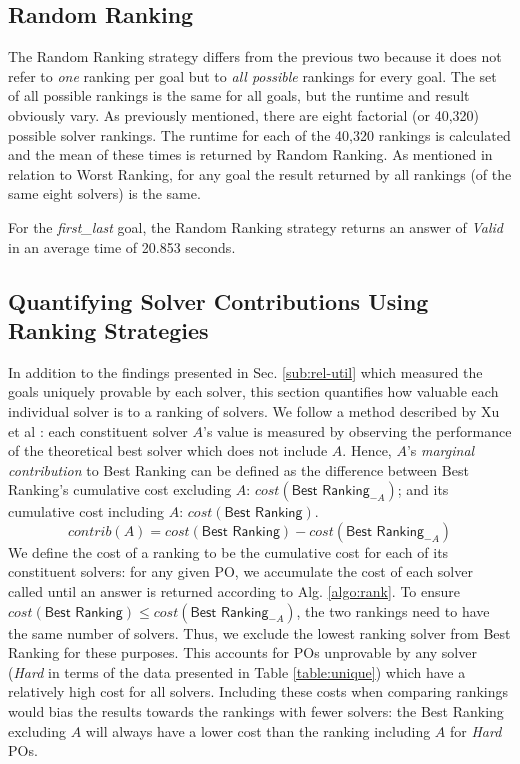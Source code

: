 \subsection{\textsf{Random Ranking}}

The \textsf{Random Ranking} strategy differs from the previous two because it does not refer to \textit{one} ranking per goal but to \textit{all possible} rankings for every goal.
The set of all possible rankings is the same for all goals, but the runtime and result obviously vary.
As previously mentioned, there are eight factorial (or 40,320) possible solver rankings.
The runtime for each of the 40,320 rankings is calculated and the mean of these times is returned by \textsf{Random Ranking}.
As mentioned in relation to \textsf{Worst Ranking}, for any goal the result returned by all rankings (of the same eight solvers) is the same.
  
For the \textit{first\_last} goal, the \textsf{Random Ranking} strategy returns an answer of \textit{Valid} in an average time of 20.853 seconds.

\subsection{Quantifying Solver Contributions Using Ranking Strategies}

\sloppypar
In addition to the findings presented in Sec. \ref{sub:rel-util} which measured the goals uniquely provable by each solver, this section quantifies how valuable each individual solver is to a ranking of solvers.
We follow a method described by Xu et al \cite{Xu2012}: each constituent solver $A$'s value is measured by observing the performance of the theoretical best solver which does not include $A$.
Hence, $A$'s \textit{marginal contribution} to \textsf{Best Ranking} can be defined as the difference between \textsf{Best Ranking}'s cumulative cost excluding $A$: $cost(\textsf{Best Ranking}_{-A})$; and its cumulative cost including $A$: $cost(\textsf{Best Ranking})$.
\[
	contrib(A) = cost(\textsf{Best Ranking}) - cost(\textsf{Best Ranking}_{-A})
\]
We define the cost of a ranking to be the cumulative cost for each of its constituent solvers:
for any given PO, we accumulate the cost of each solver called until an answer is returned according to Alg. \ref{algo:rank}.
To ensure $cost(\textsf{Best Ranking}) \leq cost(\textsf{Best Ranking}_{-A})$, the two rankings need to have the same number of solvers. 
Thus, we exclude the lowest ranking solver from \textsf{Best Ranking} for these purposes.
This accounts for POs unprovable by any solver (\textit{Hard} in terms of the data presented in Table \ref{table:unique}) which have a relatively high cost for all solvers. 
Including these costs when comparing rankings would bias the results towards the rankings with fewer solvers: the \textsf{Best Ranking} excluding $A$ will always have a lower cost than the ranking including $A$ for \textit{Hard} POs.   

